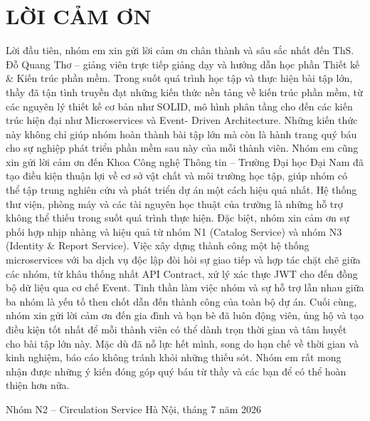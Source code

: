 \chapter*{LỜI CẢM ƠN}

Lời đầu tiên, nhóm em xin gửi lời cảm ơn chân thành và sâu sắc nhất đến ThS. Đỗ Quang Thơ – giảng viên trực tiếp giảng dạy và hướng dẫn học phần Thiết kế \& Kiến trúc phần mềm. Trong suốt quá trình học tập và thực hiện bài tập lớn, thầy đã tận tình truyền đạt những kiến thức nền tảng về kiến trúc phần mềm, từ các nguyên lý thiết kế cơ bản như SOLID, mô hình phân tầng cho đến các kiến trúc hiện đại như Microservices và Event- Driven Architecture. Những kiến thức này không chỉ giúp nhóm hoàn thành bài tập lớn mà còn là hành trang quý báu cho sự nghiệp phát triển phần mềm sau này của mỗi thành viên. Nhóm em cũng xin gửi lời cảm ơn đến Khoa Công nghệ Thông tin – Trường Đại học Đại Nam đã tạo điều kiện thuận lợi về cơ sở vật chất và môi trường học tập, giúp nhóm có thể tập trung nghiên cứu và phát triển dự án một cách hiệu quả nhất. Hệ thống thư viện, phòng máy và các tài nguyên học thuật của trường là những hỗ trợ không thể thiếu trong suốt quá trình thực hiện. Đặc biệt, nhóm xin cảm ơn sự phối hợp nhịp nhàng và hiệu quả từ nhóm N1 (Catalog Service) và nhóm N3 (Identity \& Report Service). Việc xây dựng thành công một hệ thống microservices với ba dịch vụ độc lập đòi hỏi sự giao tiếp và hợp tác chặt chẽ giữa các nhóm, từ khâu thống nhất API Contract, xử lý xác thực JWT cho đến đồng bộ dữ liệu qua cơ chế Event. Tinh thần làm việc nhóm và sự hỗ trợ lẫn nhau giữa ba nhóm là yếu tố then chốt dẫn đến thành công của toàn bộ dự án. Cuối cùng, nhóm xin gửi lời cảm ơn đến gia đình và bạn bè đã luôn động viên, ủng hộ và tạo điều kiện tốt nhất để mỗi thành viên có thể dành trọn thời gian và tâm huyết cho bài tập lớn này. Mặc dù đã nỗ lực hết mình, song do hạn chế về thời gian và kinh nghiệm, báo cáo không tránh khỏi những thiếu sót. Nhóm em rất mong nhận được những ý kiến đóng góp quý báu từ thầy và các bạn để có thể hoàn thiện hơn nữa.

Nhóm N2 – Circulation Service Hà Nội, tháng 7 năm 2026
